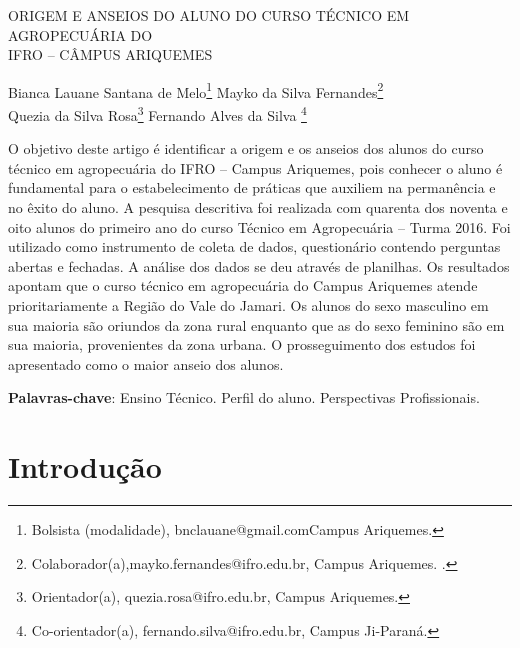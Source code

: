 \documentclass[article,12pt,onesidea,4paper,english,brazil]{abntex2}
\begin{document}
	
	
	\frenchspacing 
	
	\begin{center}
		\LARGE ORIGEM E ANSEIOS DO ALUNO DO CURSO TÉCNICO EM AGROPECUÁRIA DO \\IFRO -- CÂMPUS ARIQUEMES\
		
		
		\normalsize
		Bianca Lauane Santana de Melo\footnote{Bolsista (modalidade), bnclauane@gmail.comCampus Ariquemes. } 
		Mayko da Silva Fernandes\footnote{Colaborador(a),mayko.fernandes@ifro.edu.br, Campus Ariquemes. .} \\
	Quezia da Silva Rosa\footnote{Orientador(a), quezia.rosa@ifro.edu.br, Campus Ariquemes.} 
		Fernando Alves da Silva \footnote{ Co-orientador(a), fernando.silva@ifro.edu.br, Campus Ji-Paraná.} 
	\end{center}
	
	\begin{resumoumacoluna}
	O objetivo deste artigo é identificar a origem e os anseios dos alunos do curso técnico em agropecuária do IFRO – Campus Ariquemes, pois conhecer o aluno é fundamental para o estabelecimento de práticas que auxiliem na permanência e no êxito do aluno. A pesquisa descritiva foi realizada com quarenta dos noventa e oito alunos do primeiro ano do curso Técnico em Agropecuária – Turma 2016. Foi utilizado como instrumento de coleta de dados, questionário contendo perguntas abertas e fechadas. A análise dos dados se deu através de planilhas. Os resultados apontam que o curso técnico em agropecuária do Campus Ariquemes atende prioritariamente a Região do Vale do Jamari. Os alunos do sexo masculino em sua maioria são oriundos da zona rural enquanto que as do sexo feminino são em sua maioria, provenientes da zona urbana. O prosseguimento dos estudos foi apresentado como o maior anseio dos alunos.
	
		\vspace{\onelineskip}
		
		\noindent
		\textbf{Palavras-chave}: Ensino Técnico. Perfil do aluno. Perspectivas Profissionais. 
	\end{resumoumacoluna}
	
	\section*{Introdução}
	
\end{document}
